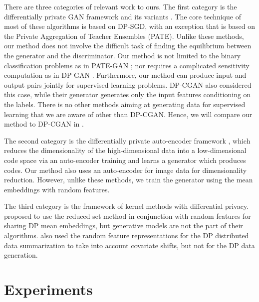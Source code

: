 \documentclass{article}
\newcommand{\mpsay}[1]{[\textbf{MP:} \textcolor{red!60!black}{#1}]}
\begin{document}
There are three categories of relevant work to ours.
The first category is the differentially private GAN framework and its variants
\cite{DPGAN, DP_CGAN, DBLP:conf/sec/FrigerioOGD19, PATE_GAN}. 
The core technique of most of these algorithms is based on DP-SGD, with an exception that \cite{PATE_GAN} is based on the Private Aggregation of Teacher Ensembles (PATE). Unlike these methods, our method does not involve the difficult task of finding the equilibrium between the generator and the discriminator. Our method is not limited to the binary classification problems as in PATE-GAN \cite{PATE_GAN}; nor requires a complicated sensitivity computation as in DP-GAN \cite{DPGAN}. Furthermore, our method can produce input and output pairs jointly for supervised learning problems. DP-CGAN \cite{DP_CGAN} also considered this case, while their generator generates only the input features conditioning on the labels. There is no other methods aiming at generating data for supervised learning that we are aware of other than DP-CGAN. Hence, we will compare our method to DP-CGAN in .  

The second category is the differentially private auto-encoder framework \cite{Abay2019, tantipongpipat2019differentially, DBLP:journals/corr/abs-1812-02274}, which reduces the dimensionality of the high-dimensional data into a low-dimensional code space via an auto-encoder training and learns a generator which produces codes. Our method also uses an auto-encoder for image data for dimensionality reduction. However, unlike these methods, we train the generator using the mean embeddings with random features.  



The third category is the framework of kernel methods with differential privacy. \citet{BalTolSch18} proposed to use the 
reduced set method in conjunction with random features for sharing DP mean embeddings, but generative models are not the part of their algorithms.  
\citet{NIPS2019_9589} also used the random feature representations  for the DP distributed data summarization to take into account covariate shifts, but not for the DP data generation.


\section{Experiments}\label{sec:experiments}
\end{document}
